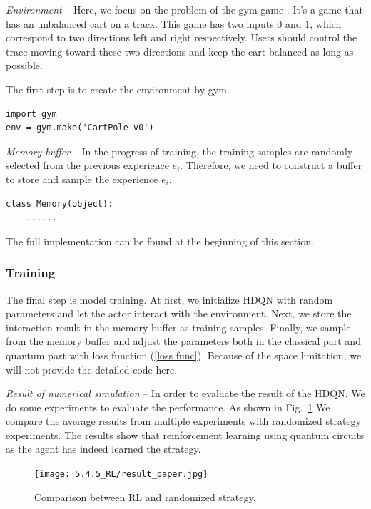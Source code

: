 \textit{Environment} -- Here, we focus on the problem of the gym game . It's a game that has an unbalanced cart on a track. This game has two inputs $0$ and $1$, which correspond to two directions left and right respectively. Users should control the trace moving toward these two directions and keep the cart balanced as long as possible.

The first step is to create the environment by gym.
\begin{lstlisting}
import gym
env = gym.make('CartPole-v0')
\end{lstlisting}
\textit{Memory buffer} -- In the progress of training, the training samples are randomly selected from the previous experience $e_i$. Therefore, we need to construct a buffer to store and sample the experience $e_i$.
\begin{lstlisting}
class Memory(object):
    ......
\end{lstlisting}

The full implementation can be found at the beginning of this section.

\subsubsection{Training}
The final step is model training. At first, we initialize HDQN with random parameters and let the actor interact with the environment. Next, we store the interaction result in the memory buffer as training samples. Finally, we sample from the memory buffer and adjust the parameters both in the classical part and quantum part with loss function (\ref{loss func}). Because of the space limitation, we will not provide the detailed code here.

\textit{Result of numerical simulation} -- In order to evaluate the result of the HDQN. We do some experiments to evaluate the performance. As shown in Fig.~\ref{stochastic} We compare the average results from multiple experiments with randomized strategy experiments. The results show that reinforcement learning using quantum circuits as the agent has indeed learned the strategy.
\begin{figure}[ht]
  \centering
  \texttt{[image: 5.4.5\_RL/result\_paper.jpg]}
  \caption{\label{stochastic} Comparison between RL and randomized strategy.}
\end{figure}
